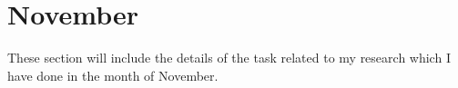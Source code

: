 \chapter{November}
\label{chap:Nov}


These section will include the details of the task related to my research which I have done in the month of November.






